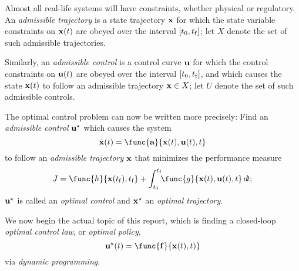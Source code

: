 \documentclass{article}
\newcommand*{\presection}{\medskip\noindent}
\begin{document}
\begin{defn}
	Almost all real-life systems will have constraints,
	whether physical or regulatory.
	An \emph{admissible trajectory}
	is a state trajectory \( {\mathbf{x}} \) for which
	the state variable constraints on \( {\mathbf{x}}(t) \) are obeyed
	over the interval \( [t_0, t_{\mathrm{f}}] \);
	let \( X \) denote the set of such admissible trajectories.
	\par
	Similarly, an \emph{admissible control}
	is a control curve \( {\mathbf{u}} \) for which
	the control constraints on \( {\mathbf{u}}(t) \) are obeyed
	over the interval \( [t_0, t_{\mathrm{f}}] \),
	and which causes the state \( {\mathbf{x}}(t) \) to follow
	an admissible trajectory \( {\mathbf{x}} \in X \);
	let \( U \) denote the set of such admissible controls.
\end{defn}

The optimal control problem can now be written more precisely:
Find an \emph{admissible control} \( {\mathbf{u}}^\star \)
which causes the system
\[
	\dot{\vecx}(t) =
		\func{\veca}{\vecx(t), \vecu(t), t}
\]
to follow an \emph{admissible trajectory} \( {\mathbf{x}} \)
that minimizes the performance measure
\[
	J = \func{h}{\vecx(t_\fl),t_\fl} +
		\intt{\func{g}{\vecx(t), \vecu(t), t} \dd t};
\]
\( {\mathbf{u}}^\star \) is called an \emph{optimal control} and
\( {\mathbf{x}}^\star \) an \emph{optimal trajectory}.

\presection
We now begin the actual topic of this report,
which is finding a closed-loop
\emph{optimal control law}, or \emph{optimal policy},
\[
	\vecu\opt(t) = \func{\mathbf{f}}{\vecx(t), t)}
\]
via \emph{dynamic programming}.
\end{document}
